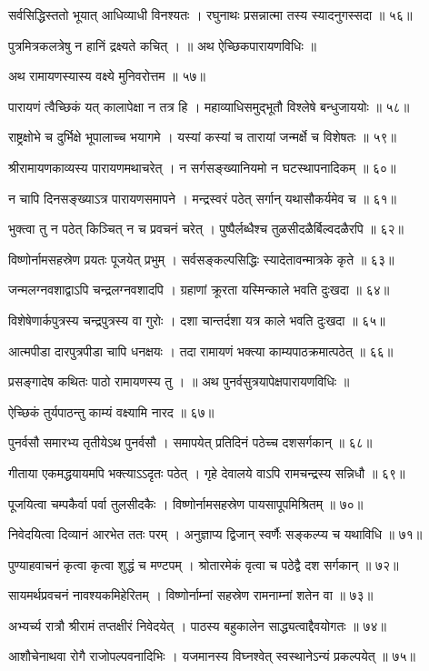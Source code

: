 सर्वसिद्धिस्ततो भूयात् आधिव्याधी विनश्यतः ।
रघुनाथः प्रसन्नात्मा तस्य स्यादनुगस्सदा ॥ ५६॥

पुत्रमित्रकलत्रेषु न हानिं द्रक्ष्यते कचित् ।
॥ अथ ऐच्छिकपारायणविधिः ॥

अथ रामायणस्यास्य वक्ष्ये मुनिवरोत्तम ॥ ५७॥

पारायणं त्वैच्छिकं यत् कालापेक्षा न तत्र हि ।
महाव्याधिसमुद्भूतौ विश्लेषे बन्धुजाययोः ॥ ५८॥

राष्ट्रक्षोभे च दुर्भिक्षे भूपालाच्च भयागमे ।
यस्यां कस्यां च तारायां जन्मर्क्षे च विशेषतः ॥ ५९॥

श्रीरामायणकाव्यस्य पारायणमथाचरेत् ।
न सर्गसङ्ख्यानियमो न घटस्थापनादिकम् ॥ ६०॥

न चापि दिनसङ्ख्याऽत्र पारायणसमापने ।
मन्द्रस्वरं पठेत् सर्गान् यथासौकर्यमेव च ॥ ६१॥

भुक्त्वा तु न पठेत् किञ्चित् न च प्रवचनं चरेत् ।
पुष्पैर्लब्धैश्च तुळसीदळैर्बिल्वदळैरपि ॥ ६२॥

विष्णोर्नामसहस्रेण प्रयतः पूजयेत् प्रभुम् ।
सर्वसङ्कल्पसिद्धिः स्यादेतावन्मात्रके कृते ॥ ६३॥

जन्मलग्नवशाद्वाऽपि चन्द्रलग्नवशादपि ।
ग्रहाणां क्रूरता यस्मिन्काले भवति दुःखदा ॥ ६४॥

विशेषेणार्कपुत्रस्य चन्द्रपुत्रस्य वा गुरोः ।
दशा चान्तर्दशा यत्र काले भवति दुःखदा ॥ ६५॥

आत्मपीडा दारपुत्रपीडा चापि धनक्षयः ।
तदा रामायणं भक्त्या काम्यपाठक्रमात्पठेत् ॥ ६६॥

प्रसङ्गादेष कथितः पाठो रामायणस्य तु ।
॥ अथ पुनर्वसुत्रयापेक्षपारायणविधिः ॥

ऐच्छिकं तुर्यपाठन्तु काम्यं वक्ष्यामि नारद ॥ ६७॥

पुनर्वसौ समारभ्य तृतीयेऽथ पुनर्वसौ ।
समापयेत् प्रतिदिनं पठेच्च दशसर्गकान् ॥ ६८॥

गीताया एकमद्धयायमपि भक्त्याऽऽदृतः पठेत् ।
गृहे देवालये वाऽपि रामचन्द्रस्य सन्निधौ ॥ ६९॥

पूजयित्वा चम्पकैर्वा पर्वा तुलसीदकैः ।
विष्णोर्नामसहस्रेण पायसापूपमिश्रितम् ॥ ७०॥

निवेदयित्वा दिव्यानं आरभेत ततः परम् ।
अनुज्ञाप्य द्विजान् स्वर्णैः सङ्कल्प्य च यथाविधि ॥ ७१॥

पुण्याहवाचनं कृत्वा कृत्वा शुद्धं च मण्टपम् ।
श्रोतारमेकं वृत्वा च पठेद्वै दश सर्गकान् ॥ ७२॥

सायमर्थप्रवचनं नावश्यकमिहेरितम् ।
विष्णोर्नाम्नां सहस्रेण रामनाम्नां शतेन वा ॥ ७३॥

अभ्यर्च्य रात्रौ श्रीरामं तप्तक्षीरं निवेदयेत् ।
पाठस्य बहुकालेन साद्ध्यत्वाद्दैवयोगतः ॥ ७४॥

आशौचेनाथवा रोगै राजोपल्पवनादिभिः ।
यजमानस्य विघ्नश्वेत् स्वस्थानेऽन्यं प्रकल्पयेत् ॥ ७५॥

